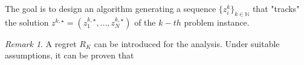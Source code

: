 \documentclass{book}
\newcommand{\N}{\mathbb{N}}
\theoremstyle{theoremv2}
\theoremstyle{defv2}
\theoremstyle{remark}
\newtheorem*{remark}{Remark}
\theoremstyle{remark}
\theoremstyle{definition}
\theoremstyle{definition}
\begin{document}
The goal is to design an algorithm generating a sequence $\{z_i^k\}_{k\in\N}$ that "tracks" the solution $z^{k,\star}=(z_1^{k,\star},\dots,z_N^{k,\star})$ of the $k-th$ problem instance.

\begin{remark}
    A regret $R_K$ can be introduced for the analysis. Under suitable assumptions, it can be proven that %
\end{remark}
\end{document}
